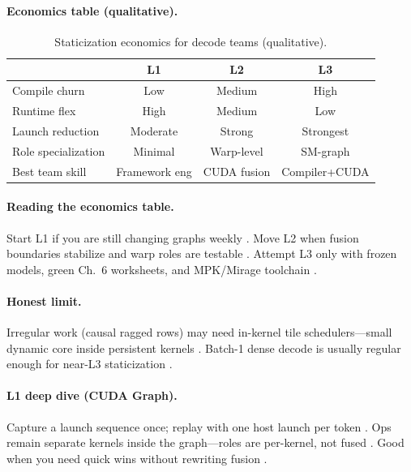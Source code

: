 \paragraph{Economics table (qualitative).}
\begin{table}[t]
\centering
\small
\caption{Staticization economics for decode teams (qualitative).}
\label{tab:ch07_static_economics}
\begin{tabular}{@{}lccc@{}}
\toprule
 & \textbf{L1} & \textbf{L2} & \textbf{L3} \\
\midrule
Compile churn & Low & Medium & High \\
Runtime flex & High & Medium & Low \\
Launch reduction & Moderate & Strong & Strongest \\
Role specialization & Minimal & Warp-level & SM-graph \\
Best team skill & Framework eng & CUDA fusion & Compiler+CUDA \\
\bottomrule
\end{tabular}
\end{table}

\paragraph{Reading the economics table.}
Start L1 if you are still changing graphs weekly \citep{nvidia2024cudagraphs,patel2025llminference}.
Move L2 when fusion boundaries stabilize and warp roles are testable \citep{shah2024flashattention3,yirage2026}.
Attempt L3 only with frozen models, green Ch.~6 worksheets, and MPK/Mirage toolchain \citep{mpk2025,wu2024mirage,chen2020compilerbasedhardw,taxbreak2026}.

\paragraph{Honest limit.}
Irregular work (causal ragged rows) may need in-kernel tile schedulers---small dynamic core inside persistent kernels \citep{shah2024flashattention3}.
Batch-1 dense decode is usually regular enough for near-L3 staticization \citep{kwon2023vllm,patel2025llminference}.

\paragraph{L1 deep dive (CUDA Graph).}
Capture a launch sequence once; replay with one host launch per token \citep{nvidia2024cudagraphs,taxbreak2026}.
Ops remain separate kernels inside the graph---roles are per-kernel, not fused \citep{patel2025llminference}.
Good when you need quick wins without rewriting fusion \citep{yirage2026,memoryfloor2026}.

